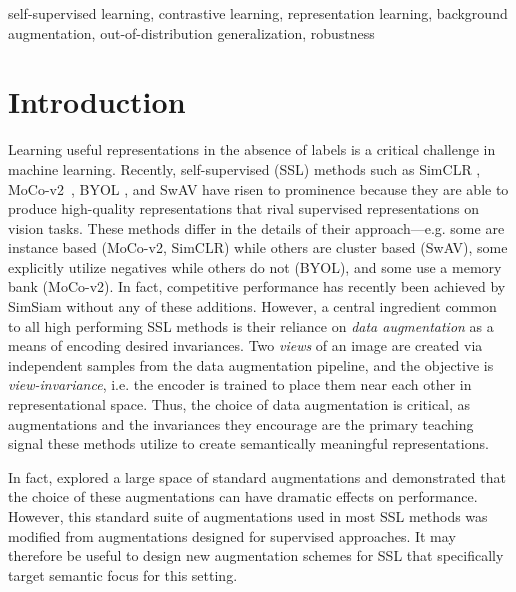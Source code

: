 \documentclass[twoside,11pt]{article}
\newcommand{\moco}{MoCo-v2}
\begin{document}
\begin{keywords}
  self-supervised learning, contrastive learning, representation learning, background augmentation, out-of-distribution generalization, robustness
\end{keywords}



\section{Introduction} \label{sec:intro}

Learning useful representations in the absence of labels is a critical challenge in machine learning. Recently, self-supervised (SSL) methods such as SimCLR \citep{chen2020simple}, \moco~\citep{he2019moco, chen2020mocov2}, BYOL \citep{grill2020bootstrap}, and SwAV \citep{swav} have risen to prominence because they are able to produce high-quality representations that rival supervised representations on vision tasks. These methods differ in the details of their approach---e.g. some are instance based (\moco, SimCLR) while others are cluster based (SwAV), some explicitly utilize negatives while others do not (BYOL), and some use a memory bank (\moco). In fact, competitive performance has recently been achieved by SimSiam \citep{simsiam} without any of these additions. However, a central ingredient common to all high performing SSL methods is their reliance on {\em data augmentation} as a means of encoding desired invariances. Two \textit{views} of an image are created via independent samples from the data augmentation pipeline, and the objective is \textit{view-invariance}, i.e. the encoder is trained to place them near each other in representational space. Thus, the choice of data augmentation is critical, as augmentations and the invariances they encourage are the primary teaching signal these methods utilize to create semantically meaningful representations. 

In fact, \citet{chen2020simple} explored a large space of standard augmentations and demonstrated that the choice of these augmentations can have dramatic effects on performance. However, this standard suite of augmentations used in most SSL methods was modified from augmentations designed for supervised approaches. It may therefore be useful to design new augmentation schemes for SSL that specifically target semantic focus for this setting. 
\end{document}
